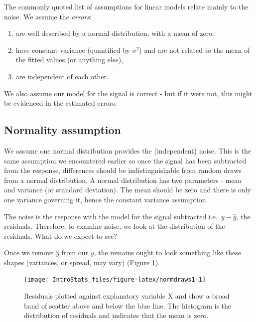 \documentclass[
  oneside]{krantz}
\begin{document}
The commonly quoted list of assumptions for linear models relate mainly to the noise. We assume the \emph{errors}:

\begin{enumerate}
\def\labelenumi{\arabic{enumi}.}
\item
  are well described by a normal distribution, with a mean of zero.
\item
  have constant variance (quantified by \(\sigma^2\)) and are not related to the mean of the fitted values (or anything else),
\item
  are independent of each other.
\end{enumerate}

We also assume our model for the signal is correct - but if it were not, this might be evidenced in the estimated errors.

\hypertarget{normality-assumption}{%
\subsection{Normality assumption}\label{normality-assumption}}

We assume one normal distribution provides the (independent) noise. This is the same assumption we encountered earlier so once the signal has been subtracted from the response, differences should be indistinguishable from random draws from a normal distribution. A normal distribution has two parameters - mean and variance (or standard deviation). The mean should be zero and there is only one variance governing it, hence the constant variance assumption.

The noise is the response with the model for the signal subtracted i.e.~\(y-\hat{y}\), the residuals. Therefore, to examine noise, we look at the distribution of the residuals. What do we expect to see?

Once we remove \(\hat{y}\) from our \(y\), the remains ought to look something like these shapes (variances, or spread, may vary) (Figure \ref{fig:normdraws1}).

\begin{figure}

{\centering \texttt{[image: IntroStats\_files/figure-latex/normdraws1-1]} 

}

\caption{Residuals plotted against explanatory variable X and show a broad band of scatter above and below the blue line. The histogram is the distribution of residuals and indicates that the mean is zero.}\label{fig:normdraws1}
\end{figure}
\end{document}
